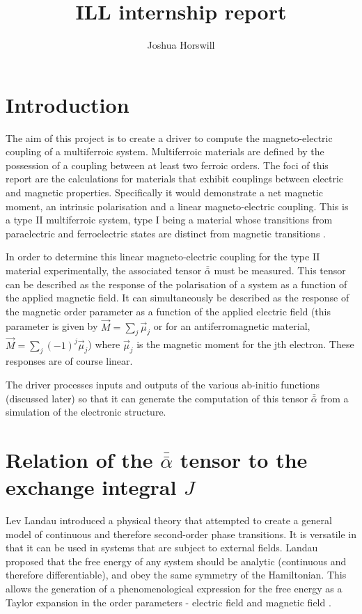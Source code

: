 \documentclass[10pt]{article}
\author{Joshua Horswill}
\title{ILL internship report}
\begin{document}
\maketitle
\tableofcontents
\section{Introduction}
The aim of this project is to create a driver to compute the magneto-electric coupling of a multiferroic system. Multiferroic materials are defined by the possession of a coupling between at least two ferroic orders. The foci of this report are the calculations for materials that exhibit couplings between electric and magnetic properties. Specifically it would demonstrate a net magnetic moment, an intrinsic polarisation and a linear magneto-electric coupling. This is a type II multiferroic system, type I being a material whose transitions from paraelectric and ferroelectric states are distinct from magnetic transitions \cite{Hur2004}\cite{goto2004ferroelectricity}.

In order to determine this linear magneto-electric coupling for the type II material experimentally, the associated tensor $\bar{\bar{\alpha}}$ must be measured. This tensor can be described as the response of the polarisation of a system as a function of the applied magnetic field. It can simultaneously be described as the response of the magnetic order parameter as a function of the applied electric field (this parameter is given by $\vec{M} = \sum_j \vec{\mu}_j$ or for an antiferromagnetic material, $\vec{M} = \sum_j (-1)^j \vec{\mu}_j$) where $\vec{\mu}_j$ is the magnetic moment for the jth electron. These responses are of course linear.

The driver processes inputs and outputs of the various ab-initio functions (discussed later) so that it can generate the computation of this tensor $\bar{\bar{\alpha}}$ from a simulation of the electronic structure.

\section{Relation of the $\bar{\bar{\alpha}}$ tensor to the exchange integral $J$}

Lev Landau introduced a physical theory that attempted to create a general model of continuous and therefore second-order phase transitions. It is versatile in that it can be used in systems that are subject to external fields. Landau proposed that the free energy of any system should be analytic (continuous and therefore differentiable), and obey the same symmetry of the Hamiltonian. This allows the generation of a phenomenological expression for the free energy as a Taylor expansion in the order parameters - electric field and magnetic field \cite{landau1936theory}.
\end{document}
